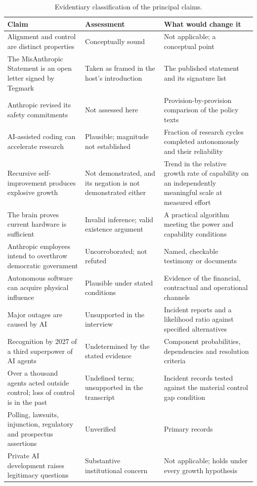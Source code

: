 \documentclass[11pt]{article}
\begin{document}
\begin{table}[h]
\centering
\small
\renewcommand{\arraystretch}{1.25}
\begin{tabular}{@{}p{}p{}p{}@{}}
\toprule
Claim & Assessment & What would change it \\
\midrule
Alignment and control are distinct properties & Conceptually sound & Not applicable; a conceptual point \\
The MisAnthropic Statement is an open letter signed by Tegmark & Taken as framed in the host's introduction & The published statement and its signature list \\
Anthropic revised its safety commitments & Not assessed here & Provision-by-provision comparison of the policy texts \\
AI-assisted coding can accelerate research & Plausible; magnitude not established & Fraction of research cycles completed autonomously and their reliability \\
Recursive self-improvement produces explosive growth & Not demonstrated, and its negation is not demonstrated either & Trend in the relative growth rate of capability on an independently meaningful scale at measured effort \\
The brain proves current hardware is sufficient & Invalid inference; valid existence argument & A practical algorithm meeting the power and capability conditions \\
Anthropic employees intend to overthrow democratic government & Uncorroborated; not refuted & Named, checkable testimony or documents \\
Autonomous software can acquire physical influence & Plausible under stated conditions & Evidence of the financial, contractual and operational channels \\
Major outages are caused by AI & Unsupported in the interview & Incident reports and a likelihood ratio against specified alternatives \\
Recognition by 2027 of a third superpower of AI agents & Undetermined by the stated evidence & Component probabilities, dependencies and resolution criteria \\
Over a thousand agents acted outside control; loss of control is in the past & Undefined term; unsupported in the transcript & Incident records tested against the material control gap condition \\
Polling, lawsuits, injunction, regulatory and prospectus assertions & Unverified & Primary records \\
Private AI development raises legitimacy questions & Substantive institutional concern & Not applicable; holds under every growth hypothesis \\
\bottomrule
\end{tabular}
\caption{Evidentiary classification of the principal claims.}
\label{tab:claims}
\end{table}
\end{document}
